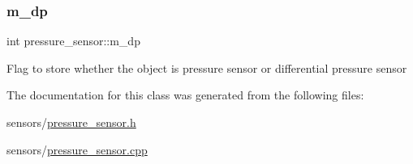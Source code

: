 \subsubsection{\texorpdfstring{m\+\_\+dp}{m\_dp}}
{\footnotesize\ttfamily int pressure\+\_\+sensor\+::m\+\_\+dp\hspace{0.3cm}{\ttfamily [protected]}}

Flag to store whether the object is pressure sensor or differential pressure sensor 

The documentation for this class was generated from the following files\+:\begin{DoxyCompactItemize}
\item 
sensors/\hyperlink{pressure__sensor_8h}{pressure\+\_\+sensor.\+h}\item 
sensors/\hyperlink{pressure__sensor_8cpp}{pressure\+\_\+sensor.\+cpp}\end{DoxyCompactItemize}
